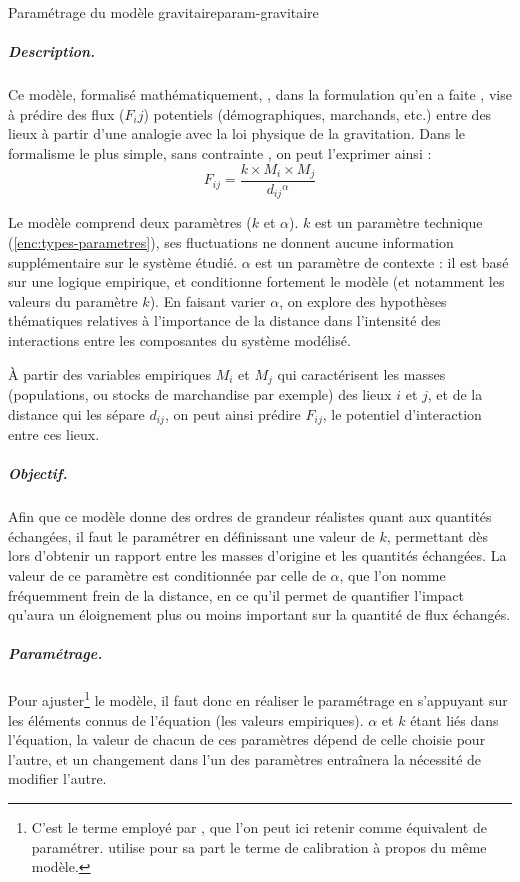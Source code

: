 \begin{encadre}{Paramétrage du modèle gravitaire}{param-gravitaire}
	\renewcommand{\thempfootnote}{\alph{mpfootnote}}
\subparagraph{Description.}
Ce modèle, formalisé mathématiquement,
, dans la formulation qu'en a faite \textcite{stewart_demographic_1948}, vise à prédire des flux ($F_ij$) potentiels (démographiques, marchands, etc.) entre des lieux à partir d'une analogie avec la loi physique de la gravitation.
Dans le formalisme le plus simple, \og sans contrainte\fg{} \autocite{pumain_les_2001}, on peut l'exprimer ainsi :
\begin{equation*}
F_{ij} = \frac{k \times M_{i} \times M_{j}}{d_{ij}{}^\alpha}
\end{equation*}

Le modèle comprend deux paramètres ($k$ et $\alpha$).
$k$ est un paramètre technique (\cref{enc:types-parametres}), ses fluctuations ne donnent aucune information supplémentaire sur le système étudié.
$\alpha$ est un paramètre de contexte : il est basé sur une logique empirique, et conditionne fortement le modèle (et notamment les valeurs du paramètre $k$).
En faisant varier $\alpha$, on explore des hypothèses thématiques relatives à l'importance de la distance dans l'intensité des interactions entre les composantes du système modélisé.

À partir des variables empiriques $M_i$ et $M_j$ qui caractérisent les masses (populations, ou stocks de  marchandise par exemple) des lieux $i$ et $j$, et de la distance qui les sépare $d_{ij}$, on peut ainsi prédire $F_{ij}$, le potentiel d'interaction entre ces lieux.

\subparagraph{Objectif.}
Afin que ce modèle donne des ordres de grandeur réalistes quant aux quantités échangées, il faut le paramétrer en définissant une valeur de $k$, permettant dès lors d'obtenir un rapport entre les masses d'origine et les quantités échangées.
La valeur de ce paramètre est conditionnée par celle de $\alpha$, que l'on nomme fréquemment \og frein de la distance\fg{}, en ce qu'il permet de quantifier l'impact qu'aura un éloignement plus ou moins important sur la quantité de flux échangés.

\subparagraph{Paramétrage.}
Pour \og ajuster\fg{}\footnote{
	C'est le terme employé par \textcite{pumain_les_2001}, que l'on peut ici retenir comme équivalent de paramétrer.
	\textcite[298]{durand1995modeles} utilise pour sa part le terme de calibration à propos du même modèle.
} le modèle, il faut donc en réaliser le paramétrage en s'appuyant sur les éléments connus de l'équation (les valeurs empiriques).
$\alpha$ et $k$ étant liés dans l'équation, la valeur de chacun de ces paramètres dépend de celle choisie pour l'autre, et un changement dans l'un des paramètres entraînera la nécessité de modifier l'autre.


\end{encadre}
